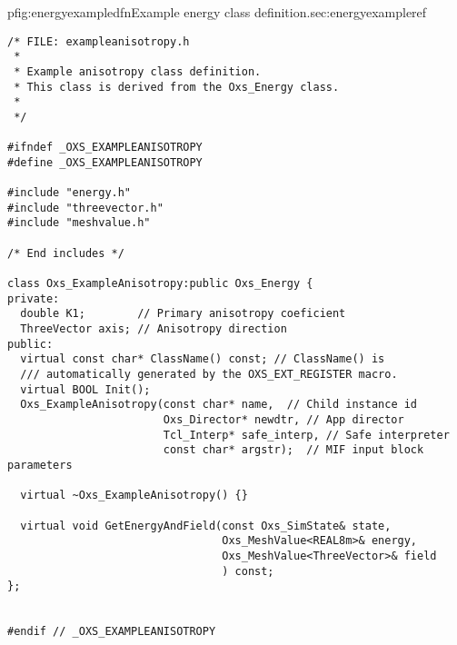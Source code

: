 \begin{codelisting}{p}{fig:energyexampledfn}{Example energy class
definition.}{sec:energyexample}{ref}
\begin{verbatim}
/* FILE: exampleanisotropy.h
 *
 * Example anisotropy class definition.
 * This class is derived from the Oxs_Energy class.
 *
 */

#ifndef _OXS_EXAMPLEANISOTROPY
#define _OXS_EXAMPLEANISOTROPY

#include "energy.h"
#include "threevector.h"
#include "meshvalue.h"

/* End includes */

class Oxs_ExampleAnisotropy:public Oxs_Energy {
private:
  double K1;        // Primary anisotropy coeficient
  ThreeVector axis; // Anisotropy direction
public:
  virtual const char* ClassName() const; // ClassName() is
  /// automatically generated by the OXS_EXT_REGISTER macro.
  virtual BOOL Init();
  Oxs_ExampleAnisotropy(const char* name,  // Child instance id
                        Oxs_Director* newdtr, // App director
                        Tcl_Interp* safe_interp, // Safe interpreter
                        const char* argstr);  // MIF input block parameters

  virtual ~Oxs_ExampleAnisotropy() {}

  virtual void GetEnergyAndField(const Oxs_SimState& state,
                                 Oxs_MeshValue<REAL8m>& energy,
                                 Oxs_MeshValue<ThreeVector>& field
                                 ) const;
};


#endif // _OXS_EXAMPLEANISOTROPY
\end{verbatim}
\end{codelisting}

